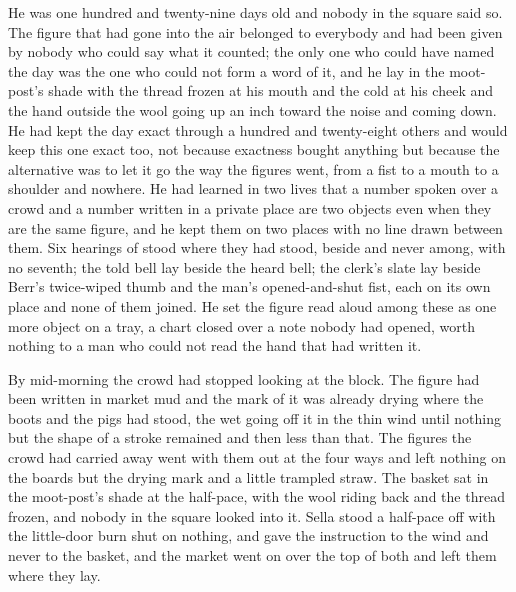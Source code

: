 He was one hundred and twenty-nine days old and nobody in the square said so. The figure that had gone into the air belonged to everybody and had been given by nobody who could say what it counted; the only one who could have named the day was the one who could not form a word of it, and he lay in the moot-post's shade with the thread frozen at his mouth and the cold at his cheek and the hand outside the wool going up an inch toward the noise and coming down. He had kept the day exact through a hundred and twenty-eight others and would keep this one exact too, not because exactness bought anything but because the alternative was to let it go the way the figures went, from a fist to a mouth to a shoulder and nowhere. He had learned in two lives that a number spoken over a crowd and a number written in a private place are two objects even when they are the same figure, and he kept them on two places with no line drawn between them. Six hearings of  stood where they had stood, beside and never among, with no seventh; the told bell lay beside the heard bell; the clerk's slate lay beside Berr's twice-wiped thumb and the man's opened-and-shut fist, each on its own place and none of them joined. He set the figure read aloud among these as one more object on a tray, a chart closed over a note nobody had opened, worth nothing to a man who could not read the hand that had written it.

By mid-morning the crowd had stopped looking at the block. The figure had been written in market mud and the mark of it was already drying where the boots and the pigs had stood, the wet going off it in the thin wind until nothing but the shape of a stroke remained and then less than that. The figures the crowd had carried away went with them out at the four ways and left nothing on the boards but the drying mark and a little trampled straw. The basket sat in the moot-post's shade at the half-pace, with the wool riding back and the thread frozen, and nobody in the square looked into it. Sella stood a half-pace off with the little-door burn shut on nothing, and gave the instruction to the wind and never to the basket, and the market went on over the top of both and left them where they lay.
